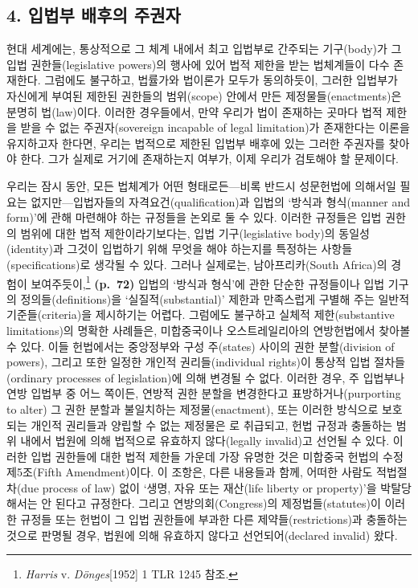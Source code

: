 \subsection{4. 입법부 배후의
주권자}\label{uxc785uxbc95uxbd80-uxbc30uxd6c4uxc758-uxc8fcuxad8cuxc790}

현대 세계에는, 통상적으로 그 체계 내에서 최고 입법부로 간주되는
기구(body)가 그 입법 권한들(legislative powers)의 행사에 있어 법적
제한을 받는 법체계들이 다수 존재한다. 그럼에도 불구하고, 법률가와
법이론가 모두가 동의하듯이, 그러한 입법부가 자신에게 부여된 제한된
권한들의 범위(scope) 안에서 만든 제정물들(enactments)은 분명히
법(law)이다. 이러한 경우들에서, 만약 우리가 법이 존재하는 곳마다 법적
제한을 받을 수 없는 주권자(sovereign incapable of legal limitation)가
존재한다는 이론을 유지하고자 한다면, 우리는 법적으로 제한된 입법부
배후에 있는 그러한 주권자를 찾아야 한다. 그가 실제로 거기에 존재하는지
여부가, 이제 우리가 검토해야 할 문제이다.

우리는 잠시 동안, 모든 법체계가 어떤 형태로든---비록 반드시 성문헌법에
의해서일 필요는 없지만---입법자들의 자격요건(qualification)과 입법의
‘방식과 형식(manner and form)’에 관해 마련해야 하는 규정들을 논외로 둘
수 있다. 이러한 규정들은 입법 권한의 범위에 대한 법적 제한이라기보다는,
입법 기구(legislative body)의 동일성(identity)과 그것이 입법하기 위해
무엇을 해야 하는지를 특정하는 사항들(specifications)로 생각될 수 있다.
그러나 실제로는, 남아프리카(South Africa)의 경험이
보여주듯이,\footnote{\emph{Harris} v. \emph{Dönges}{[}1952{]} 1 TLR 1245
  참조.} \textbf{(p.~72)} 입법의 ‘방식과 형식’에 관한 단순한 규정들이나
입법 기구의 정의들(definitions)을 ‘실질적(substantial)’ 제한과
만족스럽게 구별해 주는 일반적 기준들(criteria)을 제시하기는 어렵다.
그럼에도 불구하고 실체적 제한(substantive limitations)의 명확한
사례들은, 미합중국이나 오스트레일리아의 연방헌법에서 찾아볼 수 있다.
이들 헌법에서는 중앙정부와 구성 주(states) 사이의 권한 분할(division of
powers), 그리고 또한 일정한 개인적 권리들(individual rights)이 통상적
입법 절차들(ordinary processes of legislation)에 의해 변경될 수 없다.
이러한 경우, 주 입법부나 연방 입법부 중 어느 쪽이든, 연방적 권한 분할을
변경한다고 표방하거나(purporting to alter) 그 권한 분할과 불일치하는
제정물(enactment), 또는 이러한 방식으로 보호되는 개인적 권리들과 양립할
수 없는 제정물은 로 취급되고, 헌법 규정과
충돌하는 범위 내에서 법원에 의해 법적으로 유효하지 않다(legally
invalid)고 선언될 수 있다. 이러한 입법 권한들에 대한 법적 제한들 가운데
가장 유명한 것은 미합중국 헌법의 수정 제5조(Fifth Amendment)이다. 이
조항은, 다른 내용들과 함께, 어떠한 사람도 적법절차(due process of law)
없이 ‘생명, 자유 또는 재산(life liberty or property)’을 박탈당해서는 안
된다고 규정한다. 그리고 연방의회(Congress)의 제정법들(statutes)이 이러한
규정들 또는 헌법이 그 입법 권한들에 부과한 다른 제약들(restrictions)과
충돌하는 것으로 판명될 경우, 법원에 의해 유효하지 않다고
선언되어(declared invalid) 왔다.


